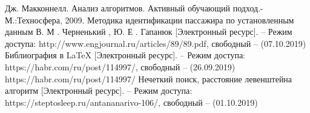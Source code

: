 \documentclass[a4paper,12pt]{article}
\begin{document}
\pagebreak

\begin{thebibliography}{4}
Дж. Макконнелл. Анализ алгоритмов. Активный обучающий подход.-
М.:Техносфера, 2009.
Методика идентификации пассажира по установленным данным В. М . Черненький , Ю. Е . Гапанюк [Электронный ресурс]. – Режим доступа: http://www.engjournal.ru/articles/89/89.pdf, свободный – (07.10.2019)
Библиография в LaTeX [Электронный ресурс]. – Режим доступа: https://habr.com/ru/post/114997/, свободный – (26.09.2019)
https://habr.com/ru/post/114997/
Нечеткий поиск, расстояние левенштейна алгоритм [Электронный ресурс]. – Режим доступа: https://steptosleep.ru/antananarivo-106/, свободный – (01.10.2019)

\end{thebibliography}
\end{document}
